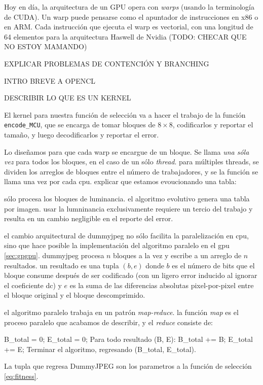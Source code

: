 Hoy en día, la arquitectura de un GPU opera con \emph{warps} (usando la
terminología de CUDA). Un warp puede pensarse como el apuntador de
instrucciones en x86 o en ARM. Cada instrucción que ejecuta el warp es
vectorial, con una longitud de 64 elementos para la arquitectura Haswell de
Nvidia (TODO: CHECAR QUE NO ESTOY MAMANDO)

EXPLICAR PROBLEMAS DE CONTENCIÓN Y BRANCHING

INTRO BREVE A OPENCL

DESCRIBIR LO QUE ES UN KERNEL

El kernel para nuestra función de selección va a hacer el trabajo de la función
\verb+encode_MCU+, que se encarga de tomar bloques de $8\times8$, codificarlos
y reportar el tamaño, y luego decodificarlos y reportar el error.

Lo diseñamos para que cada warp se encargue de un bloque. Se llama \emph{una sóla vez} para todos los bloques, en el caso de un sólo
\emph{thread}. para múltiples threads, se dividen los arreglos de bloques entre
el número de trabajadores, y se la función se llama una vez por cada cpu.
explicar que estamos evoucionando una tabla:

sólo procesa los bloques de luminancia. el algoritmo evolutivo genera una tabla
por imagen. usar la lumninancia exclusivamente requiere un tercio del trabajo y
resulta en un cambio negligible en el reporte del error.

el cambio arquitectural de dummyjpeg no sólo facilita la paralelización en cpu,
sino que hace posible la implementación del algoritmo paralelo en el gpu
\ref{sec:gpgpu}. dummyjpeg procesa $n$ bloques a la vez y escribe a un arreglo
de $n$ resultados. un resultado es una tupla $(b, e)$ donde $b$ es el número de
bits que el bloque consume después de ser codificado (con un ligero error
inducido al ignorar el coeficiente dc) y $e$ es la suma de las diferencias
absolutas pixel-por-pixel entre el bloque original y el bloque descomprimido.

el algoritmo paralelo trabaja en un patrón \emph{map-reduce}. la función \emph{map} es el proceso paralelo que acabamos de describir, y el \emph{reduce} consiste de:

\begin{code}
    B_total = 0;
    E_total = 0;
    Para todo resultado (B, E):
       B_total += B;
       E_total += E;
    Terminar el algoritmo, regresando (B_total, E_total).
\end{code}

La tupla que regresa DummyJPEG son los parametros a la función de selección
\ref{eq:fitness}.

